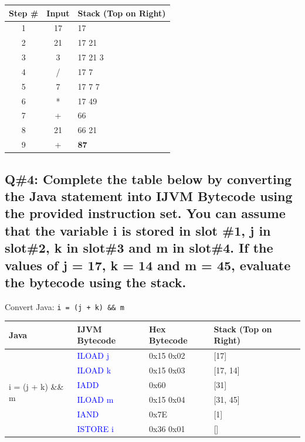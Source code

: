 \begin{center}
\begin{tabular}{|c|c|l|}
\hline
\textbf{Step \#} & \textbf{Input} & \textbf{Stack (Top on Right)} \\
\hline
1 & 17 & 17 \\
2 & 21 & 17 21 \\
3 & 3 & 17 21 3 \\
4 & / & 17 7 \\
5 & 7 & 17 7 7 \\
6 & * & 17 49 \\
7 & + & 66 \\
8 & 21 & 66 21 \\
9 & + & \textbf{87} \\
\hline
\end{tabular}
\end{center}

\subsection*{Q\#4: Complete the table below by converting the Java statement into IJVM Bytecode using the
provided instruction set. You can assume that the variable i is stored in slot \#1, j in slot\#2, k in slot\#3
and m in slot\#4. If the values of j = 17, k = 14 and m = 45, evaluate the bytecode using the stack.}
Convert Java: \texttt{i = (j + k) \&\& m}


\noindent
\begin{tabularx}{\textwidth}{|X|X|X|X|}
\hline
\textbf{Java} & \textbf{IJVM Bytecode} & \textbf{Hex Bytecode} & \textbf{Stack (Top on Right)} \\
\hline
\multirow{6}{=}{i = (j + k) \&\& m}
& \textcolor{blue}{ILOAD j} & 0x15 0x02 & [17] \\
& \textcolor{blue}{ILOAD k} & 0x15 0x03 & [17, 14] \\
& \textcolor{blue}{IADD} & 0x60 & [31] \\
& \textcolor{blue}{ILOAD m} & 0x15 0x04 & [31, 45] \\
& \textcolor{blue}{IAND} & 0x7E & [1] \\
& \textcolor{blue}{ISTORE i} & 0x36 0x01 & [] \\
\hline
\end{tabularx}


